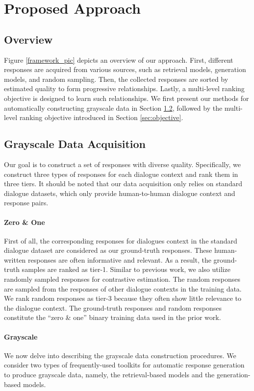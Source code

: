 \documentclass[11pt,a4paper]{article}
\begin{document}
	\section{Proposed Approach}
	\subsection{Overview}
	Figure \ref{framework_pic} depicts an overview of our approach. First, different responses are acquired from various sources, such as retrieval models, generation models, and random sampling. Then, the collected responses are sorted by estimated quality to form progressive relationships. Lastly, a multi-level ranking objective is designed to learn such relationships. We first present our methods for automatically constructing grayscale data in Section \ref{sec:Construction}, followed by the multi-level ranking objective introduced in Section \ref{sec:objective}.
	\subsection{Grayscale Data Acquisition}
	\label{sec:Construction}
	Our goal is to construct a set of responses with diverse quality. Specifically, we construct three types of responses for each dialogue context and rank them in three tiers. It should be noted that our data acquisition only relies on standard dialogue datasets, which only provide human-to-human dialogue context and response pairs. 
	\paragraph{Zero \& One} First of all, the corresponding responses for dialogues context in the standard dialogue dataset are considered as our ground-truth responses. These human-written responses are often informative and relevant. As a result, the ground-truth samples are ranked as tier-1. Similar to previous work, we also utilize randomly sampled responses for contrastive estimation. The random responses are sampled from the responses of other dialogue contexts in the training data. We rank random responses as tier-3 because they often show little relevance to the dialogue context. The ground-truth responses and random responses constitute the ``zero \& one'' binary training data used in the prior work.
	
	\paragraph{Grayscale} We now delve into describing the grayscale data construction procedures. We consider two types of frequently-used toolkits for automatic response generation to produce grayscale data, namely, the retrieval-based models and the generation-based models.
	
\end{document}
